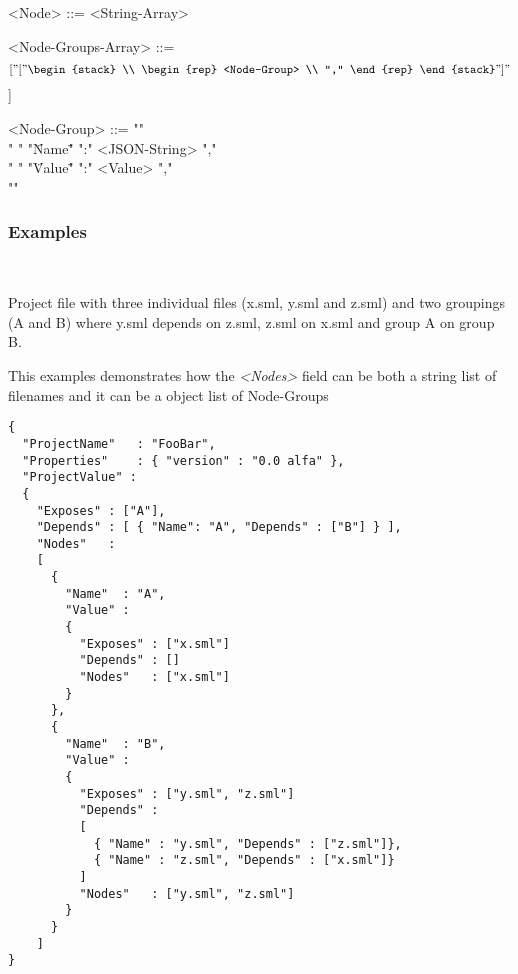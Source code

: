 \begin{grammar}
<Node> ::= <String-Array>

<Node-Groups-Array> ::= \[[
    "["
    \begin{stack}
      \\
      \begin{rep}
        <Node-Group> \\
        ","
      \end{rep}
    \end{stack}
    "]"
    \]]

<Node-Group> ::= "{" \\
  "  " "\"Name\"" ":" <JSON-String> "," \\
  "  " "\"Value\"" ":" <Value> "," \\
  "}"
\end{grammar}

\subsubsection{Examples}

\begin{example}\ 

  Project file with three individual files (x.sml, y.sml and z.sml) and two
  groupings (A and B) where y.sml depends on z.sml, z.sml on x.sml and group A
  on group B.

  This examples demonstrates how the \textit{<Nodes>} field can be both a string
  list of filenames and it can be a object list of Node-Groups

\begin{lstlisting}
{
  "ProjectName"   : "FooBar",
  "Properties"    : { "version" : "0.0 alfa" },
  "ProjectValue" :
  {
    "Exposes" : ["A"],
    "Depends" : [ { "Name": "A", "Depends" : ["B"] } ],
    "Nodes"   : 		
    [
      {
        "Name"  : "A",
        "Value" :
        {
          "Exposes" : ["x.sml"]
          "Depends" : []
          "Nodes"   : ["x.sml"]
        }
      },
      {
        "Name"  : "B",
        "Value" :
        {
          "Exposes" : ["y.sml", "z.sml"]
          "Depends" : 
          [ 
            { "Name" : "y.sml", "Depends" : ["z.sml"]},
            { "Name" : "z.sml", "Depends" : ["x.sml"]} 
          ]
          "Nodes"   : ["y.sml", "z.sml"]
        }
      }
    ]
}
\end{lstlisting}

\end{example}


